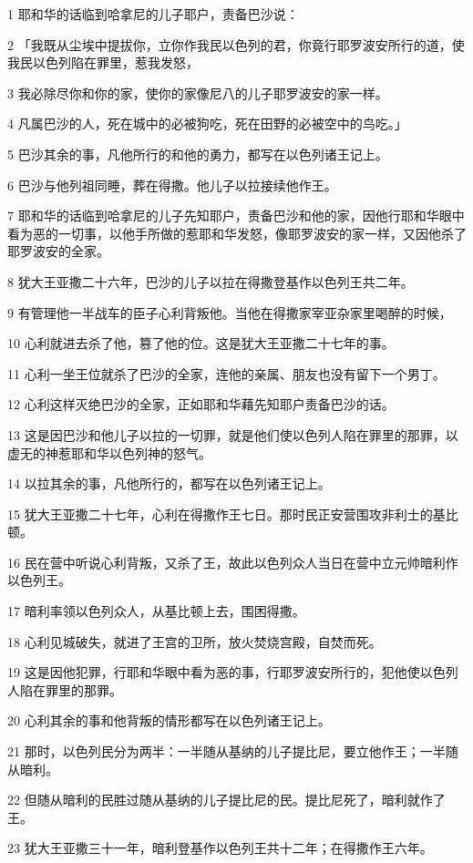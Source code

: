 \par 1 耶和华的话临到哈拿尼的儿子耶户，责备巴沙说：
\par 2 「我既从尘埃中提拔你，立你作我民以色列的君，你竟行耶罗波安所行的道，使我民以色列陷在罪里，惹我发怒，
\par 3 我必除尽你和你的家，使你的家像尼八的儿子耶罗波安的家一样。
\par 4 凡属巴沙的人，死在城中的必被狗吃，死在田野的必被空中的鸟吃。」
\par 5 巴沙其余的事，凡他所行的和他的勇力，都写在以色列诸王记上。
\par 6 巴沙与他列祖同睡，葬在得撒。他儿子以拉接续他作王。
\par 7 耶和华的话临到哈拿尼的儿子先知耶户，责备巴沙和他的家，因他行耶和华眼中看为恶的一切事，以他手所做的惹耶和华发怒，像耶罗波安的家一样，又因他杀了耶罗波安的全家。
\par 8 犹大王亚撒二十六年，巴沙的儿子以拉在得撒登基作以色列王共二年。
\par 9 有管理他一半战车的臣子心利背叛他。当他在得撒家宰亚杂家里喝醉的时候，
\par 10 心利就进去杀了他，篡了他的位。这是犹大王亚撒二十七年的事。
\par 11 心利一坐王位就杀了巴沙的全家，连他的亲属、朋友也没有留下一个男丁。
\par 12 心利这样灭绝巴沙的全家，正如耶和华藉先知耶户责备巴沙的话。
\par 13 这是因巴沙和他儿子以拉的一切罪，就是他们使以色列人陷在罪里的那罪，以虚无的神惹耶和华以色列神的怒气。
\par 14 以拉其余的事，凡他所行的，都写在以色列诸王记上。
\par 15 犹大王亚撒二十七年，心利在得撒作王七日。那时民正安营围攻非利士的基比顿。
\par 16 民在营中听说心利背叛，又杀了王，故此以色列众人当日在营中立元帅暗利作以色列王。
\par 17 暗利率领以色列众人，从基比顿上去，围困得撒。
\par 18 心利见城破失，就进了王宫的卫所，放火焚烧宫殿，自焚而死。
\par 19 这是因他犯罪，行耶和华眼中看为恶的事，行耶罗波安所行的，犯他使以色列人陷在罪里的那罪。
\par 20 心利其余的事和他背叛的情形都写在以色列诸王记上。
\par 21 那时，以色列民分为两半：一半随从基纳的儿子提比尼，要立他作王；一半随从暗利。
\par 22 但随从暗利的民胜过随从基纳的儿子提比尼的民。提比尼死了，暗利就作了王。
\par 23 犹大王亚撒三十一年，暗利登基作以色列王共十二年；在得撒作王六年。
